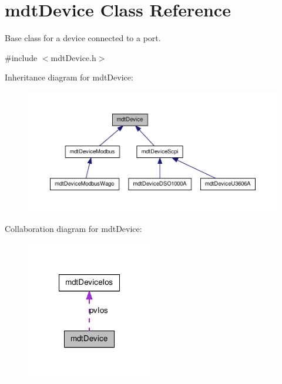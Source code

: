 \hypertarget{classmdt_device}{
\section{mdtDevice Class Reference}
\label{classmdt_device}
}


Base class for a device connected to a port.  




{\ttfamily \#include $<$mdtDevice.h$>$}



Inheritance diagram for mdtDevice:\nopagebreak
\begin{figure}[H]
\begin{center}
\leavevmode
\includegraphics[width=400pt]{classmdt_device__inherit__graph}
\end{center}
\end{figure}


Collaboration diagram for mdtDevice:\nopagebreak
\begin{figure}[H]
\begin{center}
\leavevmode
\includegraphics[width=156pt]{classmdt_device__coll__graph}
\end{center}
\end{figure}
